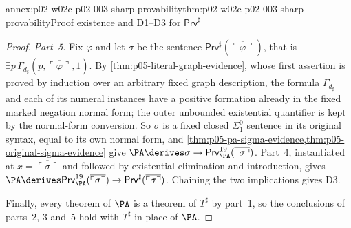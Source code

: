 \begin{annexitem}{annex:p02-w02c-p02-003-sharp-provability}{thm:p02-w02c-p02-003-sharp-provability}{Proof existence and D1--D3 for \(\mathsf{Prv}^{\sharp}\)}
\begin{proof}
\emph{Part~5.}  Fix \(\varphi\) and let \(\sigma\) be the sentence
\(\mathsf{Prv}^{\sharp}(\overline{\ulcorner\varphi\urcorner})\), that is
\(\exists p\,\Gamma_{d_{\sharp}}(p,\overline{\ulcorner\varphi\urcorner},\bar1)\).
By \cref{thm:p05-literal-graph-evidence}, whose first assertion is proved by
induction over an arbitrary fixed graph description, the formula
\(\Gamma_{d_{\sharp}}\) and each of its numeral instances have a positive
formation already in the fixed marked negation normal form; the outer
unbounded existential quantifier is kept by the normal-form conversion.
So \(\sigma\) is a fixed closed \(\Sigma^0_1\) sentence in its original
syntax, equal to its own normal form, and
\cref{thm:p05-pa-sigma-evidence,thm:p05-original-sigma-evidence} give
\(\PA\derives\sigma\to\mathsf{Prv}^{19}_{\PA}(\overline{\ulcorner\sigma
\urcorner})\).  Part~4, instantiated at
\(x=\overline{\ulcorner\sigma\urcorner}\) and followed by existential
elimination and introduction, gives
\(\PA\derives\mathsf{Prv}^{19}_{\PA}(\overline{\ulcorner\sigma\urcorner})
\to\mathsf{Prv}^{\sharp}(\overline{\ulcorner\sigma\urcorner})\).  Chaining
the two implications gives D3.

Finally, every theorem of \(\PA\) is a theorem of \(T^{\sharp}\) by
part~1, so the conclusions of parts~2, 3 and~5 hold with \(T^{\sharp}\) in
place of \(\PA\).
\end{proof}
\end{annexitem}

